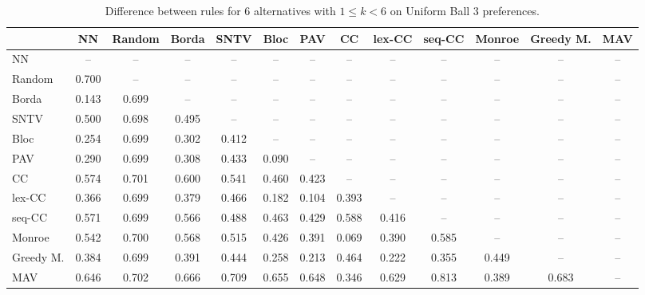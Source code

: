 
\begin{table*}[htbp]
\centering
\begin{tabular}{lcccccccccccc}
\toprule
 & NN & Random & Borda & SNTV & Bloc & PAV & CC & lex-CC & seq-CC & Monroe & Greedy M. & MAV \\
\midrule
NN & -- & -- & -- & -- & -- & -- & -- & -- & -- & -- & -- & -- \\
Random & \cellcolor{blue!70} 0.700 & -- & -- & -- & -- & -- & -- & -- & -- & -- & -- & -- \\
Borda & \cellcolor{blue!14} 0.143 & \cellcolor{blue!69} 0.699 & -- & -- & -- & -- & -- & -- & -- & -- & -- & -- \\
SNTV & \cellcolor{blue!50} 0.500 & \cellcolor{blue!69} 0.698 & \cellcolor{blue!49} 0.495 & -- & -- & -- & -- & -- & -- & -- & -- & -- \\
Bloc & \cellcolor{blue!25} 0.254 & \cellcolor{blue!69} 0.699 & \cellcolor{blue!30} 0.302 & \cellcolor{blue!41} 0.412 & -- & -- & -- & -- & -- & -- & -- & -- \\
PAV & \cellcolor{blue!28} 0.290 & \cellcolor{blue!69} 0.699 & \cellcolor{blue!30} 0.308 & \cellcolor{blue!43} 0.433 & \cellcolor{blue!9} 0.090 & -- & -- & -- & -- & -- & -- & -- \\
CC & \cellcolor{blue!57} 0.574 & \cellcolor{blue!70} 0.701 & \cellcolor{blue!60} 0.600 & \cellcolor{blue!54} 0.541 & \cellcolor{blue!46} 0.460 & \cellcolor{blue!42} 0.423 & -- & -- & -- & -- & -- & -- \\
lex-CC & \cellcolor{blue!36} 0.366 & \cellcolor{blue!69} 0.699 & \cellcolor{blue!37} 0.379 & \cellcolor{blue!46} 0.466 & \cellcolor{blue!18} 0.182 & \cellcolor{blue!10} 0.104 & \cellcolor{blue!39} 0.393 & -- & -- & -- & -- & -- \\
seq-CC & \cellcolor{blue!57} 0.571 & \cellcolor{blue!69} 0.699 & \cellcolor{blue!56} 0.566 & \cellcolor{blue!48} 0.488 & \cellcolor{blue!46} 0.463 & \cellcolor{blue!42} 0.429 & \cellcolor{blue!58} 0.588 & \cellcolor{blue!41} 0.416 & -- & -- & -- & -- \\
Monroe & \cellcolor{blue!54} 0.542 & \cellcolor{blue!70} 0.700 & \cellcolor{blue!56} 0.568 & \cellcolor{blue!51} 0.515 & \cellcolor{blue!42} 0.426 & \cellcolor{blue!39} 0.391 & \cellcolor{blue!6} 0.069 & \cellcolor{blue!39} 0.390 & \cellcolor{blue!58} 0.585 & -- & -- & -- \\
Greedy M. & \cellcolor{blue!38} 0.384 & \cellcolor{blue!69} 0.699 & \cellcolor{blue!39} 0.391 & \cellcolor{blue!44} 0.444 & \cellcolor{blue!25} 0.258 & \cellcolor{blue!21} 0.213 & \cellcolor{blue!46} 0.464 & \cellcolor{blue!22} 0.222 & \cellcolor{blue!35} 0.355 & \cellcolor{blue!44} 0.449 & -- & -- \\
MAV & \cellcolor{blue!64} 0.646 & \cellcolor{blue!70} 0.702 & \cellcolor{blue!66} 0.666 & \cellcolor{blue!70} 0.709 & \cellcolor{blue!65} 0.655 & \cellcolor{blue!64} 0.648 & \cellcolor{blue!34} 0.346 & \cellcolor{blue!62} 0.629 & \cellcolor{blue!81} 0.813 & \cellcolor{blue!38} 0.389 & \cellcolor{blue!68} 0.683 & -- \\
\bottomrule
\end{tabular}

\caption{Difference between rules for 6 alternatives with $1 \leq k < 6$ on Uniform Ball 3 preferences.}
\label{tab:rule_distance_heatmap-m=[6]-pref_dist=euclidean__args__dimensions=3_-_space=uniform_ball}
\end{table*}
    